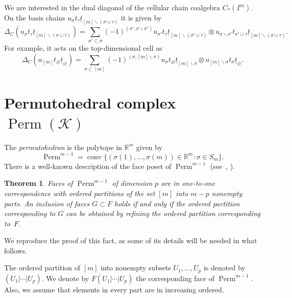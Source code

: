 \documentclass[a4paper,12pt]{amsart}
\newcommand{\K}{\mathcal K}
\newcommand{\RR}{\mathbb R}
\newtheorem{theorem}[formula]{Theorem}
\theoremstyle{definition}
\theoremstyle{remark}
\numberwithin{equation}{section}
\DeclareMathOperator{\conv}{conv}
\DeclareMathOperator{\Perm}{Perm}
\begin{document}
We are interested in the dual diagonal of the cellular chain coalgebra $C_*(I^m)$. On the basis chains $u_\sigma t_\tau \underline{t}_{[m] \backslash (\sigma \cup \tau)}$ it is given by
$$\Delta_{C}(u_\sigma t_\tau \underline{t}_{[m] \backslash (\sigma \cup \tau)}) = \sum_{\sigma' \subset \sigma} (-1)^{(\sigma', \sigma \backslash \sigma')} u_{\sigma'} t_\tau \underline{t}_{[m] \backslash (\sigma' \cup \tau)} \otimes u_{\sigma \backslash \sigma'} t_{\sigma' \cup \tau} \underline{t}_{[m] \backslash (\sigma \cup \tau)}.$$
For example, it acts on the top-dimensional cell as
\begin{equation}\label{DeltaC}
  \Delta_{C}(u_{[m]} t_\varnothing \underline{t}_{\varnothing}) = \sum_{\sigma \subset [m]} (-1)^{(\sigma, [m] \backslash \sigma)} u_{\sigma} t_\varnothing \underline{t}_{[m] \backslash \sigma} \otimes u_{[m] \backslash \sigma} t_{\sigma} \underline{t}_{\varnothing}.
\end{equation}  



\section{Permutohedral complex $\Perm(\K)$}
The \textit{permutohedron} is the polytope in $\RR^m$ given by
\[
  \Perm^{m-1} = \conv\{\left({ \sigma(1), \ldots, \sigma(m) } \right) \in \RR^m \colon \sigma \in S_m \}.
\]  
There is a well-known description of the face poset of $\Perm^{m-1}$ (see~\cite[Proposition~1.5.5]{BP}, \cite[Chapter~0]{Zieg}).

\begin{theorem}\label{Perm-face}
Faces of $\Perm^{m-1}$ of dimension $p$ are in one-to-one correspondence with ordered partitions of the set $[m]$ into $m - p$ nonempty parts. An inclusion of faces $G \subset F$ holds if and only if the ordered partition corresponding to $G$ can be obtained by refining the ordered partition corresponding to~$F$.
\end{theorem}

We reproduce the proof of this fact, as some of its details will be needed in what follows.

The ordered partition of $[m]$ into nonempty subsets $U_1, \ldots, U_p$ is denoted by $(U_1 | \cdots | U_p)$.
We denote by $F(U_1 | \cdots | U_p )$ the corresponding face of $\Perm^{m-1}$. 
Also, we assume that elements in every part are in increasing ordered.
\end{document}
